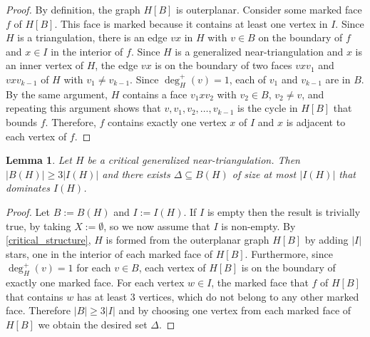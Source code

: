 \documentclass[12pt]{article}
\newtheorem{lem}{Lemma}
\theoremstyle{definition}
\begin{document}
\begin{proof}
  By definition, the graph $H[B]$ is outerplanar.  Consider some marked face $f$ of $H[B]$.  This face is marked because it contains at least one vertex in $I$.  Since $H$ is a triangulation, there is an edge $vx$ in $H$ with $v\in B$ on the boundary of $f$ and $x\in I$ in the interior of $f$. Since $H$ is a generalized near-triangulation and $x$ is an inner vertex of $H$, the edge $vx$ is on the boundary of two faces $vxv_1$ and $vxv_{k-1}$ of $H$ with $v_1\neq v_{k-1}$.  Since $\deg^+_H(v)=1$, each of $v_1$ and $v_{k-1}$ are in $B$.  By the same argument, $H$ contains a face $v_1xv_2$ with $v_2\in B$, $v_2\neq v$, and repeating this argument shows that $v,v_1,v_2,\ldots,v_{k-1}$ is the cycle in $H[B]$ that bounds $f$.  Therefore, $f$ contains exactly one vertex $x$ of $I$ and $x$ is adjacent to each vertex of $f$.
\end{proof}

\begin{lem}\label{base_case}
    Let $H$ be a critical generalized near-triangulation. Then $|B(H)|\ge 3|I(H)|$ and there exists $\Delta\subseteq B(H)$ of size at most $|I(H)|$ that dominates $I(H)$.
\end{lem}

\begin{proof}
  Let $B:=B(H)$ and $I:=I(H)$.  If $I$ is empty then the result is trivially true, by taking $X:=\emptyset$, so we now assume that $I$ is non-empty.  By \cref{critical_structure}, $H$ is formed from the outerplanar graph $H[B]$ by adding $|I|$ stars, one in the interior of each marked face of $H[B]$.  Furthermore, since $\deg_H^+(v)=1$ for each $v\in B$, each vertex of $H[B]$ is on the boundary of exactly one marked face.  For each vertex $w\in I$, the marked face that $f$ of $H[B]$ that contains $w$ has at least $3$ vertices, which do not belong to any other marked face. Therefore $|B|\ge 3|I|$ and by choosing one vertex from each marked face of $H[B]$ we obtain the desired set $\Delta$.
\end{proof}
\end{document}
